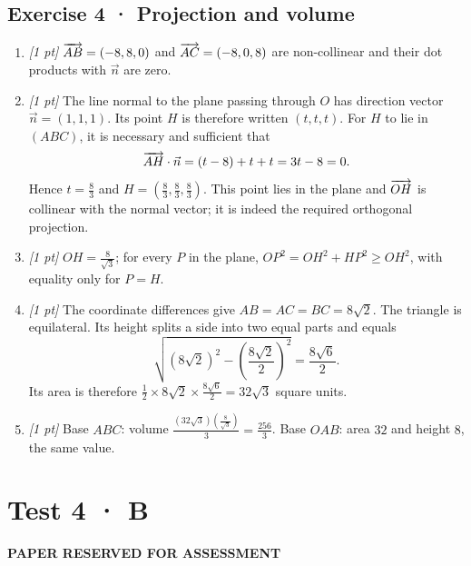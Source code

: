 \subsection*{Exercise 4 · Projection and volume}\begin{enumerate}

\item \textit{[1 pt]} $\overrightarrow{AB}=(-8,8,0)$ and $\overrightarrow{AC}=(-8,0,8)$ are non-collinear and their dot products with $\vec n$ are zero.

\item \textit{[1 pt]} The line normal to the plane passing through $O$ has direction vector $\vec n=(1,1,1)$. Its point $H$ is therefore written $(t,t,t)$. For $H$ to lie in $(ABC)$, it is necessary and sufficient that
\[\overrightarrow{AH}\cdot\vec n=(t-8)+t+t=3t-8=0.\]
Hence $t=\frac{8}{3}$ and $H=(\frac{8}{3},\frac{8}{3},\frac{8}{3})$. This point lies in the plane and $\overrightarrow{OH}$ is collinear with the normal vector; it is indeed the required orthogonal projection.

\item \textit{[1 pt]} $OH=\frac{8}{\sqrt{3}}$; for every $P$ in the plane, $OP^2=OH^2+HP^2\ge OH^2$, with equality only for $P=H$.

\item \textit{[1 pt]} The coordinate differences give $AB=AC=BC=8\sqrt2$. The triangle is equilateral. Its height splits a side into two equal parts and equals
\[\sqrt{(8\sqrt2)^2-(\frac{8\sqrt{2}}{2})^2}=\frac{8\sqrt6}{2}.\]
Its area is therefore $\frac12\times 8\sqrt2\times\frac{8\sqrt6}{2}=32\sqrt3$ square units.

\item \textit{[1 pt]} Base $ABC$: volume $\frac{(32\sqrt3)(\frac{8}{\sqrt{3}})}{3}=\frac{256}{3}$. Base $OAB$: area $32$ and height $8$, the same value.

\end{enumerate}

\fi

\fi

\ifprof

\clearpage{}\label{sujet:6-4}

\section*{Test 4 · B}

{\sffamily\bfseries\color{amber}PAPER RESERVED FOR ASSESSMENT\par}

